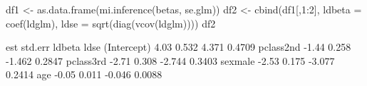 \begin{Schunk}
\begin{Sinput}
 df1 <- as.data.frame(mi.inference(betas, se.glm))
 df2 <- cbind(df1[,1:2], ldbeta = coef(ldglm), ldse = sqrt(diag(vcov(ldglm))))
 df2
\end{Sinput}
\begin{Soutput}
              est std.err ldbeta   ldse
(Intercept)  4.03   0.532  4.371 0.4709
pclass2nd   -1.44   0.258 -1.462 0.2847
pclass3rd   -2.71   0.308 -2.744 0.3403
sexmale     -2.53   0.175 -3.077 0.2414
age         -0.05   0.011 -0.046 0.0088
\end{Soutput}
\end{Schunk}
